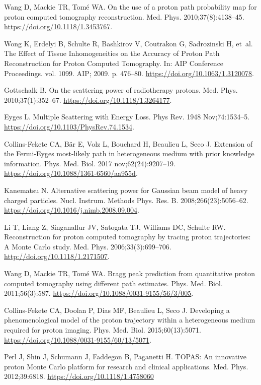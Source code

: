 \documentclass[preprint,times]{elsarticle}
\begin{document}
\begin{thebibliography}{99}
Wang D, Mackie TR, Tom\'e WA. On the use of a proton path probability map for proton computed tomography reconstruction. Med. Phys. 2010;37(8):4138--45. \url{https://doi.org/10.1118/1.3453767}.

Wong K, Erdelyi B, Schulte R, Bashkirov V, Coutrakon G, Sadrozinski H, et~al. {The Effect of Tissue Inhomogeneities on the Accuracy of Proton Path Reconstruction for Proton Computed Tomography}. In: AIP Conference Proceedings. vol. 1099. AIP; 2009. p. 476--80. \url{https://doi.org/10.1063/1.3120078}.

Gottschalk B. On the scattering power of radiotherapy protons. Med. Phys. 2010;37(1):352--67. \url{https://doi.org/10.1118/1.3264177}.

Eyges L. Multiple Scattering with Energy Loss. Phys Rev. 1948 Nov;74:1534--5. \url{https://doi.org/10.1103/PhysRev.74.1534}.

Collins-Fekete CA, B{\"a}r E, Volz L, Bouchard H, Beaulieu L, Seco J. {Extension of the Fermi-Eyges most-likely path in heterogeneous medium with prior knowledge information}. Phys. Med. Biol. 2017 nov;62(24):9207--19. \url{https://doi.org/10.1088/1361-6560/aa955d}.

Kanematsu N. Alternative scattering power for Gaussian beam model of heavy charged particles. Nucl. Instrum. Methods Phys. Res. B. 2008;266(23):5056--62. \url{https://doi.org/10.1016/j.nimb.2008.09.004}.

Li T, Liang Z, Singanallur JV, Satogata TJ, Williams DC, Schulte RW. Reconstruction for proton computed tomography by tracing proton trajectories: A Monte Carlo study. Med. Phys. 2006;33(3):699--706. \url{http://doi.org/10.1118/1.2171507}.

Wang D, Mackie TR, Tomé WA. Bragg peak prediction from quantitative proton computed tomography using different path estimates. Phys. Med. Biol. 2011;56(3):587. \url{https://doi.org/10.1088/0031-9155/56/3/005}.

Collins-Fekete CA, Doolan P, Dias MF, Beaulieu L, Seco J. Developing a phenomenological model of the proton trajectory within a heterogeneous medium required for proton imaging. Phys. Med. Biol. 2015;60(13):5071. \url{https://doi.org/10.1088/0031-9155/60/13/5071}.

Perl J, Shin J, Schumann J, Faddegon B, Paganetti H. {TOPAS: An innovative proton Monte Carlo platform for research and clinical applications}. Med. Phys. 2012;39:6818. \url{https://doi.org/10.1118/1.4758060}


\end{thebibliography}
\end{document}
